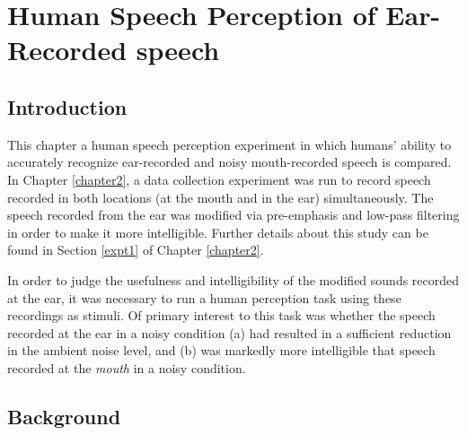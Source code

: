 % 
% 
% 

\chapter{Human Speech Perception of Ear-Recorded speech\label{chapter3}}


\section{Introduction}\label{chap3:introduction}

This chapter \DIFdelbegin {}\DIFdelend \DIFaddbegin {}\DIFaddend a human speech perception experiment in which humans' ability to accurately recognize ear-recorded and noisy mouth-recorded speech is compared.  In Chapter \ref{chapter2}, a data collection experiment was run to record speech recorded in both locations (at the mouth and in the ear) simultaneously.  The speech recorded from the ear was modified via pre-emphasis and low-pass filtering in order to make it more intelligible.  Further details about this study can be found in Section \ref{expt1} of Chapter \ref{chapter2}.

In order to judge the usefulness and intelligibility of the modified sounds recorded at the ear, it was necessary to run a human perception task using these recordings as stimuli.  Of primary interest to this task was whether the speech recorded at the ear in a noisy condition (a) had resulted in a sufficient reduction in the ambient noise level, and (b) was markedly more intelligible that speech recorded at the \textit{mouth} in a noisy condition.

\section{Background}\label{chap3:background}


